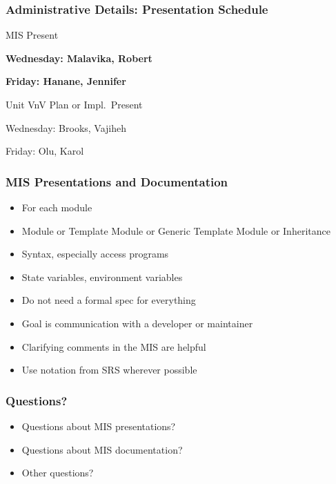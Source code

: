 \documentclass[t,12pt,numbers,fleqn,handout]{beamer}
\begin{document}

\begin{frame}
\frametitle{Administrative Details: Presentation Schedule}

\bi
\item MIS Present
\bi
\item \textbf{Wednesday: Malavika, Robert}
\item \textbf{Friday: Hanane,  Jennifer}
\ei
\item Unit VnV Plan or Impl.\ Present
\bi
\item Wednesday: Brooks, Vajiheh
\item Friday: Olu, Karol
\ei
\ei

\end{frame}


\begin{frame}
\frametitle{MIS Presentations and Documentation}
\begin{itemize}
\item For each module
\bi
\item Module or Template Module or Generic Template Module or Inheritance
\item Syntax, especially access programs
\item State variables, environment variables
\ei
\item Do not need a formal spec for everything
\item Goal is communication with a developer or maintainer
\item Clarifying comments in the MIS are helpful
\item Use notation from SRS wherever possible
\end{itemize}
\end{frame}


\begin{frame}
\frametitle{Questions?}
\begin{itemize}
\item Questions about MIS presentations?
\item Questions about MIS documentation?
\item Other questions?
\end{itemize}
\end{frame}

\end{document}
